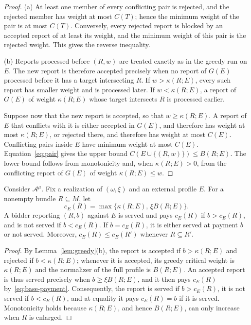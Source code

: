 \documentclass[format=acmsmall, review=false]{acmart}
\begin{document}
\begin{proof}
(a) At least one member of every conflicting pair is rejected,
and the rejected member has weight at most \(C(T)\); hence the
minimum weight of the pair is at most \(C(T)\). Conversely, every
rejected report is blocked by an accepted report of at least its
weight, and the minimum weight of this pair is the rejected
weight. This gives the reverse inequality.

(b) Reports processed before \((R,w)\) are treated exactly as in
the greedy run on \(E\). The new report is therefore accepted
precisely when no report of \(G(E)\) processed before it has a
target intersecting \(R\). If \(w>\kappa(R;E)\), every such
report has smaller weight and is processed later. If
\(w<\kappa(R;E)\), a report of \(G(E)\) of weight
\(\kappa(R;E)\) whose target intersects \(R\) is processed
earlier.

Suppose now that the new report is accepted, so that
\(w\ge\kappa(R;E)\). A report of \(E\) that conflicts with it is
either accepted in \(G(E)\), and therefore has weight at most
\(\kappa(R;E)\), or rejected there, and therefore has weight at
most \(C(E)\). Conflicting pairs inside \(E\) have minimum weight
at most \(C(E)\). Equation~\eqref{eq:pair} gives the upper bound
\(C(E\cup\{(R,w)\})\le B(R;E)\). The lower bound follows from
monotonicity and, when \(\kappa(R;E)>0\), from the conflicting
report of \(G(E)\) of weight \(\kappa(R;E)\le w\).
\end{proof}

\begin{lemma}
\label{lem:threshold}
Consider \(\mathcal A^{\mu}\). Fix a realization of
\((\omega,\xi)\) and an external profile \(E\). For a nonempty
bundle \(R\subseteq M\), let
\[
c_E(R)=\max\{\kappa(R;E),\,\xi B(R;E)\}.
\]
A bidder reporting \((R,b)\) against \(E\) is served and pays
\(c_E(R)\) if \(b>c_E(R)\), and is not served if \(b<c_E(R)\).
If \(b=c_E(R)\), it is either served at payment \(b\) or not
served. Moreover, \(c_E(R)\le c_E(R')\) whenever
\(R\subseteq R'\).
\end{lemma}

\begin{proof}
By Lemma~\ref{lem:greedy}(b), the report is accepted if
\(b>\kappa(R;E)\) and rejected if \(b<\kappa(R;E)\); whenever it
is accepted, its greedy critical weight is \(\kappa(R;E)\) and
the normalizer of the full profile is \(B(R;E)\). An accepted
report is thus served precisely when \(b\ge\xi B(R;E)\), and it
then pays \(c_E(R)\) by~\eqref{eq:base-payment}. Consequently,
the report is served if \(b>c_E(R)\), it is not served if
\(b<c_E(R)\), and at equality it pays \(c_E(R)=b\) if it is
served. Monotonicity holds because \(\kappa(R;E)\), and hence
\(B(R;E)\), can only increase when \(R\) is enlarged.
\end{proof}
\end{document}

